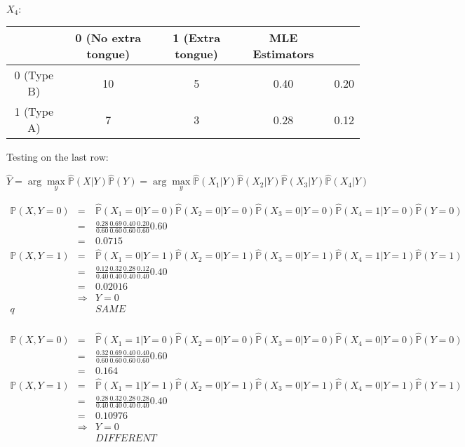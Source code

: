 \documentclass[12pt]{article}
\begin{document}
$X_4:$

\begin{tabular}{c || c | c || c c}
               & 0 (No extra tongue) & 1 (Extra tongue) & MLE Estimators & \\
  \hline
  \hline
  0 (Type B)   & 10 & 5 & 0.40 & 0.20 \\
  \hline
  1 (Type A)   & 7 & 3  & 0.28 & 0.12 \\
\end{tabular}

Testing on the last row:

$$\hat{Y} 
= \arg \max_y \hat{\mathbb{P}}(X|Y) \hat{\mathbb{P}}(Y)
= \arg \max_y \hat{\mathbb{P}}(X_1|Y) 
\hat{\mathbb{P}}(X_2|Y) \hat{\mathbb{P}}(X_3|Y) \hat{\mathbb{P}}(X_4|Y)$$

\begin{eqnarray*}
  \mathbb{P}(X, Y=0)
	&=& \hat{\mathbb{P}}(X_1=0|Y=0) \hat{\mathbb{P}}(X_2=0|Y=0)
	  \hat{\mathbb{P}}(X_3=0|Y=0) \hat{\mathbb{P}}(X_4=1|Y=0) \hat{\mathbb{P}}(Y=0)\\
	&=& \frac{0.28}{0.60} \frac{0.69}{0.60} \frac{0.40}{0.60} \frac{0.20}{0.60} 0.60 \\
	&=& 0.0715 \\ 
  \mathbb{P}(X, Y=1)
	&=& \hat{\mathbb{P}}(X_1=0|Y=1) \hat{\mathbb{P}}(X_2=0|Y=1)
	  \hat{\mathbb{P}}(X_3=0|Y=1) \hat{\mathbb{P}}(X_4=1|Y=1) \hat{\mathbb{P}}(Y=1)\\
	&=& \frac{0.12}{0.40} \frac{0.32}{0.40} \frac{0.28}{0.40} \frac{0.12}{0.40} 0.40 \\
	&=& 0.02016 \\
	&\Rightarrow& Y=0 \\q
	&& SAME \\ 
\end{eqnarray*}


\begin{eqnarray*}
  \mathbb{P}(X, Y=0)
	&=& \hat{\mathbb{P}}(X_1=1|Y=0) \hat{\mathbb{P}}(X_2=0|Y=0)
	  \hat{\mathbb{P}}(X_3=0|Y=0) \hat{\mathbb{P}}(X_4=0|Y=0) \hat{\mathbb{P}}(Y=0)\\
	&=& \frac{0.32}{0.60} \frac{0.69}{0.60} \frac{0.40}{0.60} \frac{0.40}{0.60} 0.60 \\
	&=&  0.164\\ 
  \mathbb{P}(X, Y=1)
	&=& \hat{\mathbb{P}}(X_1=1|Y=1) \hat{\mathbb{P}}(X_2=0|Y=1)
	  \hat{\mathbb{P}}(X_3=0|Y=1) \hat{\mathbb{P}}(X_4=0|Y=1) \hat{\mathbb{P}}(Y=1)\\
	&=& \frac{0.28}{0.40} \frac{0.32}{0.40} \frac{0.28}{0.40} \frac{0.28}{0.40} 0.40 \\
	&=&  0.10976\\
	&\Rightarrow& Y=0\\ 
	&& DIFFERENT \\
\end{eqnarray*}
\end{document}
